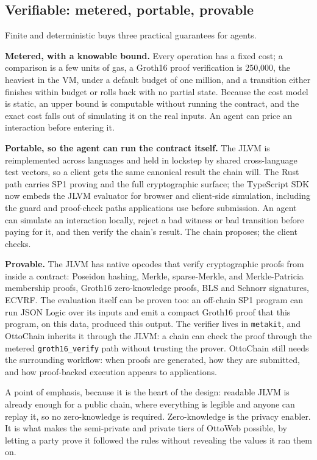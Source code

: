 \documentclass[11pt,a4paper]{article}
\begin{document}
\subsection{Verifiable: metered, portable, provable}

Finite and deterministic buys three practical guarantees for agents.

\textbf{Metered, with a knowable bound.} Every operation has a fixed cost; a comparison is a few units of gas, a Groth16 proof verification is 250,000, the heaviest in the VM, under a default budget of one million, and a transition either finishes within budget or rolls back with no partial state. Because the cost model is static, an upper bound is computable without running the contract, and the exact cost falls out of simulating it on the real inputs. An agent can price an interaction before entering it.

\textbf{Portable, so the agent can run the contract itself.} The JLVM is reimplemented across languages and held in lockstep by shared cross-language test vectors, so a client gets the same canonical result the chain will. The Rust path carries SP1 proving and the full cryptographic surface; the TypeScript SDK now embeds the JLVM evaluator for browser and client-side simulation, including the guard and proof-check paths applications use before submission. An agent can simulate an interaction locally, reject a bad witness or bad transition before paying for it, and then verify the chain's result. The chain proposes; the client checks.

\textbf{Provable.} The JLVM has native opcodes that verify cryptographic proofs from inside a contract: Poseidon hashing, Merkle, sparse-Merkle, and Merkle-Patricia membership proofs, Groth16 zero-knowledge proofs, BLS and Schnorr signatures, ECVRF. The evaluation itself can be proven too: an off-chain SP1 program can run JSON Logic over its inputs and emit a compact Groth16 proof that this program, on this data, produced this output. The verifier lives in \texttt{metakit}, and OttoChain inherits it through the JLVM: a chain can check the proof through the metered \texttt{groth16\_verify} path without trusting the prover. OttoChain still needs the surrounding workflow: when proofs are generated, how they are submitted, and how proof-backed execution appears to applications.

A point of emphasis, because it is the heart of the design: readable JLVM is already enough for a public chain, where everything is legible and anyone can replay it, so no zero-knowledge is required. Zero-knowledge is the privacy enabler. It is what makes the semi-private and private tiers of OttoWeb possible, by letting a party prove it followed the rules without revealing the values it ran them on.
\end{document}
